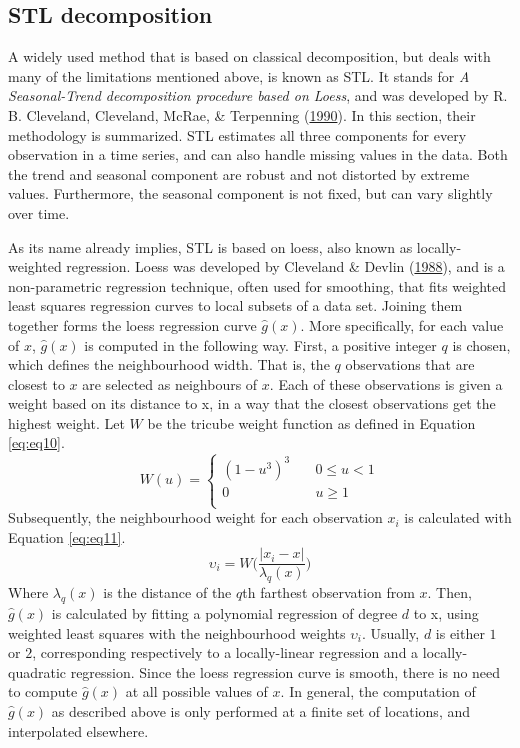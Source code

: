 \documentclass[12pt,oneside]{reedthesis}
\begin{document}
\subsection{STL decomposition}\label{twothreethree}

A widely used method that is based on classical decomposition, but deals
with many of the limitations mentioned above, is known as STL. It stands
for \emph{A Seasonal-Trend decomposition procedure based on Loess}, and
was developed by R. B. Cleveland, Cleveland, McRae, \& Terpenning
(\protect\hyperlink{ref-cleveland1990}{1990}). In this section, their
methodology is summarized. STL estimates all three components for every
observation in a time series, and can also handle missing values in the
data. Both the trend and seasonal component are robust and not distorted
by extreme values. Furthermore, the seasonal component is not fixed, but
can vary slightly over time.

As its name already implies, STL is based on loess, also known as
locally-weighted regression. Loess was developed by Cleveland \& Devlin
(\protect\hyperlink{ref-cleveland1988}{1988}), and is a non-parametric
regression technique, often used for smoothing, that fits weighted least
squares regression curves to local subsets of a data set. Joining them
together forms the loess regression curve \(\hat{g}(x)\). More
specifically, for each value of \(x\), \(\hat{g}(x)\) is computed in the
following way. First, a positive integer \(q\) is chosen, which defines
the neighbourhood width. That is, the \(q\) observations that are
closest to \(x\) are selected as neighbours of \(x\). Each of these
observations is given a weight based on its distance to x, in a way that
the closest observations get the highest weight. Let \(W\) be the
tricube weight function as defined in Equation \eqref{eq:eq10}.
\begin{equation}
W(u) = 
    \begin{cases}
      (1 - u^{3})^{3} &\quad 0 \leq u < 1\\
      0 &\quad u \geq 1\\
    \end{cases}
\label{eq:eq10}
\end{equation}
Subsequently, the neighbourhood weight for each observation \(x_{i}\) is
calculated with Equation \eqref{eq:eq11}.
\begin{equation}
\upsilon_{i} = W\Bigg(\frac{|x_{i} - x|}{\lambda_{q}(x)}\Bigg)
\label{eq:eq11}
\end{equation}
Where \(\lambda_{q}(x)\) is the distance of the \(q\)th farthest
observation from \(x\). Then, \(\hat{g}(x)\) is calculated by fitting a
polynomial regression of degree \(d\) to x, using weighted least squares
with the neighbourhood weights \(\upsilon_{i}\). Usually, \(d\) is
either \(1\) or \(2\), corresponding respectively to a locally-linear
regression and a locally-quadratic regression. Since the loess
regression curve is smooth, there is no need to compute \(\hat{g}(x)\)
at all possible values of \(x\). In general, the computation of
\(\hat{g}(x)\) as described above is only performed at a finite set of
locations, and interpolated elsewhere.
\end{document}

